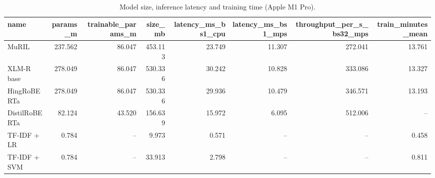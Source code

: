\begin{table}[t]
\centering
\small
\caption{Model size, inference latency and training time (Apple M1 Pro).}
\label{tab:tab12_runtime_size}
\begin{tabular}{lrrrrrrr}
\toprule
name & params\_m & trainable\_params\_m & size\_mb & latency\_ms\_bs1\_cpu & latency\_ms\_bs1\_mps & throughput\_per\_s\_bs32\_mps & train\_minutes\_mean \\
\midrule
MuRIL & 237.562 & 86.047 & 453.113 & 23.749 & 11.307 & 272.041 & 13.761 \\
XLM-R base & 278.049 & 86.047 & 530.336 & 30.242 & 10.828 & 333.086 & 13.327 \\
HingRoBERTa & 278.049 & 86.047 & 530.336 & 29.936 & 10.479 & 346.571 & 13.193 \\
DistilRoBERTa & 82.124 & 43.520 & 156.639 & 15.972 & 6.095 & 512.006 & -- \\
TF-IDF + LR & 0.784 & -- & 9.973 & 0.571 & -- & -- & 0.458 \\
TF-IDF + SVM & 0.784 & -- & 33.913 & 2.798 & -- & -- & 0.811 \\
\bottomrule
\end{tabular}
\end{table}
